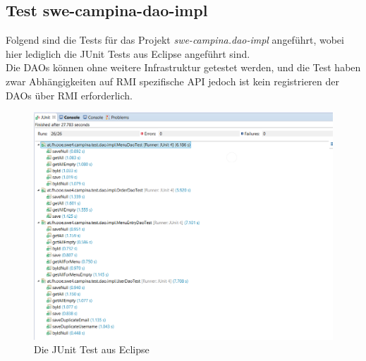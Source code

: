 \documentclass[11pt, a4paper, twoside]{article}   	%
\begin{document}
\subsection{Test swe-campina-dao-impl}
Folgend sind die Tests für das Projekt \emph{swe-campina.dao-impl} angeführt, wobei hier lediglich die JUnit Tests aus Eclipse angeführt sind.\\
Die DAOs können ohne weitere Infrastruktur getestet werden, und die Test haben zwar Abhängigkeiten auf RMI spezifische API jedoch ist kein registrieren der DAOs über RMI erforderlich.
  
\begin{figure}[h]
	\centering
	\includegraphics[scale=0.7]{images/dao-test.PNG}
	\caption
	{Die JUnit Test aus Eclipse}
\end{figure}
\newpage 
\end{document}
